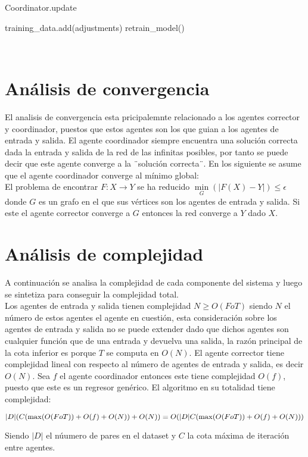  \begin{algorithm}[H]
 \caption{Coordinator.update}
 training\_data.add(adjustments)\;
 retrain\_model()\;
 \end{algorithm} \\



 \section*{Análisis de convergencia}
 
    El analisis de convergencia esta pricipalemnte relacionado a los agentes corrector y coordinador, puestos que estos agentes son los que guian a los agentes 
    de entrada y salida. El agente coordinador siempre encuentra una solución correcta dada la entrada y salida de la red de las infinitas posibles, por tanto se 
    puede decir que este agente converge a la ¨solución correcta¨. En los siguiente se asume que el agente coordinador converge al mínimo global: \\

    El problema de encontrar $F:X \rightarrow Y$ se ha reducido $\underset{G}{\min}(|F(X)-Y|) \leq \epsilon$ donde $G$ es un grafo en el que sus vértices son los agentes de entrada y salida. Si 
    este el agente corrector converge a $G$  entonces la red converge a $Y$ dado $X$.


 \section*{Análisis de complejidad}

    A continuación se analisa la complejidad de cada componente del sistema y luego se sintetiza para conseguir la complejidad total. \\

    Los agentes de entrada y salida tienen complejidad $N \geq O(FoT) $ siendo $N$ el número de estos agentes el agente en cuestión, esta consideración 
    sobre los agentes de entrada y salida no se puede extender dado que dichos agentes son cualquier función que de una entrada y devuelva una salida, la 
    razón principal de la cota inferior es porque $T$ se computa en $O(N)$. El agente corrector tiene complejidad lineal con respecto al número de agentes 
    de entrada y salida, es decir $O(N)$. Sea $f$ el agente coordinador entonces este tiene complejidad $O(f)$, puesto que este es un regresor genérico. 
    El algoritmo en su totalidad tiene complejidad: 
    \begin{center}
        
        \begin{equation*}
                
                |D|(C( \max(O(F o T )) + O(f) + O(N)) + O(N)) \\
                = O(|D|C( \max(O(F o T )) + O(f) + O(N)))\\

        \end{equation*}

    \end{center}

Siendo $|D|$ el núumero de pares en el dataset y $C$ la cota máxima de iteración entre agentes.